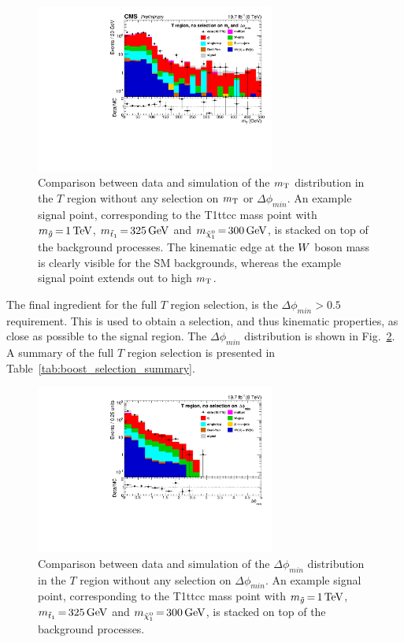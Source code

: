 \begin{figure}[htbp]
\centering
\includegraphics[width=0.7\textwidth]{figures/razor_selection/DataMC_mT_g1Mbg1W1Ll_rebin}
\caption{Comparison between data and simulation of the $m_{\mathrm{T}}$ distribution in the $T$ region without
any selection on $m_{\mathrm{T}}$ or $\Delta\phi_{min}$. An example signal
point, corresponding to the T1ttcc mass point with $m_{\tilde{g}} \,{=}\, 1\,\text{Te\hspace{-.08em}V}$,
$m_{\tilde{t}_1} \,{=}\, 325\,\text{Ge\hspace{-.08em}V}$ and $m_{\tilde{\chi}_1^0} \,{=}\, 300\,\text{Ge\hspace{-.08em}V}$, is stacked on top of
the
background processes. The kinematic edge at the $W$ boson mass is clearly
visible for the SM backgrounds, whereas the example signal point extends out to high $m_{\mathrm{T}}$.
\label{fig:boost_T_region_mT}}
\end{figure}

The final ingredient for the full $T$ region selection, is the $\Delta\phi_{min} > 0.5$
requirement. This is used to obtain a selection, and thus kinematic properties, as close as
possible to the signal region. The $\Delta\phi_{min}$ distribution is shown in
Fig.~\ref{fig:boost_T_region_mindeltaphi}. A summary of the full $T$ region selection is presented
in Table~\ref{tab:boost_selection_summary}. 


\begin{figure}[htbp]
\centering
\includegraphics[width=0.7\textwidth]
{figures/razor_selection/plots/DataMC_minDeltaPhi_g1Mbg1W1LlmT100_rebin}
\caption{Comparison between data and simulation of the $\Delta\phi_{min}$ distribution in the $T$
region without any selection on $\Delta\phi_{min}$. An example signal
point, corresponding to the T1ttcc mass point with $m_{\tilde{g}} \,{=}\, 1\,\text{Te\hspace{-.08em}V}$,
$m_{\tilde{t}_1} \,{=}\, 325\,\text{Ge\hspace{-.08em}V}$ and $m_{\tilde{\chi}_1^0} \,{=}\, 300\,\text{Ge\hspace{-.08em}V}$, is stacked on top of
the
background processes.
\label{fig:boost_T_region_mindeltaphi}}
\end{figure}


